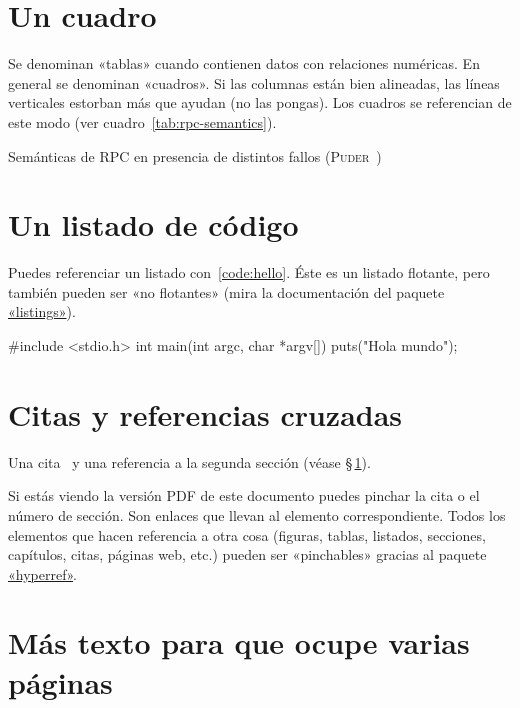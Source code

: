 \section{Un cuadro}
\label{sec:uncuadro}

Se denominan «tablas» cuando contienen datos con relaciones numéricas. En
general se denominan «cuadros». Si las columnas están bien alineadas, las líneas
verticales estorban más que ayudan (no las pongas). Los cuadros se referencian
de este modo (ver cuadro~\ref{tab:rpc-semantics}).

\begin{table}[htbp]
  \centering
  {\small
  
  }
  \caption[Semánticas de \acs{RPC} en presencia de distintos fallos]
  {Semánticas de \acs{RPC} en presencia de distintos fallos
    (\textsc{Puder}~\cite{puder05:_distr_system_archit})}
  \label{tab:rpc-semantics}
\end{table}


\section{Un listado de código}
\label{sec:listado}

Puedes referenciar un listado con~\ref{code:hello}. Éste es un listado flotante,
pero también pueden ser «no flotantes» (mira la documentación del paquete
\href{http://www.ctan.org/get/macros/latex/contrib/listings/listings.pdf}{«listings»}).

\begin{listing}[
  float,
  language = C,
  caption  = {«Hola mundo» en C},
  label    = code:hello]
#include <stdio.h>
int main(int argc, char *argv[]) {
    puts("Hola mundo\n");
}
\end{listing}




\section{Citas y referencias cruzadas}

Una cita~\cite{design_patterns} y una referencia a la segunda sección (véase
\S\,\ref{sec:uncuadro}).

Si estás viendo la versión PDF de este documento puedes pinchar la cita o el
número de sección. Son enlaces que llevan al elemento correspondiente. Todos los
elementos que hacen referencia a otra cosa (figuras, tablas, listados,
secciones, capítulos, citas, páginas web, etc.) pueden ser «pinchables» gracias al
paquete \href{http://latex.tugraz.at/_media/docs/hyperref.pdf}{«hyperref»}.



\section{Más texto para que ocupe varias páginas}





